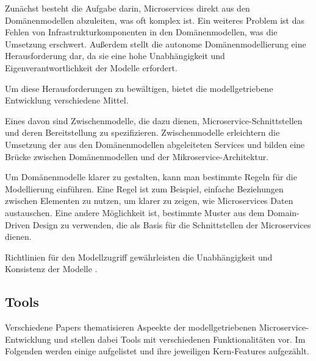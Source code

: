 {Zunächst besteht die Aufgabe darin, Microservices direkt aus den Domänenmodellen abzuleiten, was oft komplex ist. Ein weiteres Problem ist das Fehlen von Infrastrukturkomponenten in den Domänenmodellen, was die Umsetzung erschwert. Außerdem stellt die autonome Domänenmodellierung eine Herausforderung dar, da sie eine hohe Unabhängigkeit und Eigenverantwortlichkeit der Modelle erfordert.

Um diese Herausforderungen zu bewältigen, bietet die modellgetriebene Entwicklung verschiedene Mittel.

Eines davon sind Zwischenmodelle, die dazu dienen, Microservice-Schnittstellen und deren Bereitstellung zu spezifizieren. Zwischenmodelle erleichtern die Umsetzung der aus den Domänenmodellen abgeleiteten Services und bilden eine Brücke zwischen Domänenmodellen und der Mikroservice-Architektur.

Um Domänenmodelle klarer zu gestalten, kann man bestimmte Regeln für die Modellierung einführen. Eine Regel ist zum Beispiel, einfache Beziehungen zwischen Elementen zu nutzen, um klarer zu zeigen, wie Microservices Daten austauschen. Eine andere Möglichkeit ist, bestimmte Muster aus dem Domain-Driven Design zu verwenden, die als Basis für die Schnittstellen der Microservices dienen.

Richtlinien für den Modellzugriff gewährleisten die Unabhängigkeit und Konsistenz der Modelle \cite{rademacher}.

\newpage
\subsection{Tools}

Verschiedene Papers thematisieren Aspeekte der modellgetriebenen Microservice-Entwicklung und stellen dabei Tools mit verschiedenen Funktionalitäten vor. Im Folgenden werden einige aufgelistet und ihre jeweiligen Kern-Features aufgezählt.

}
